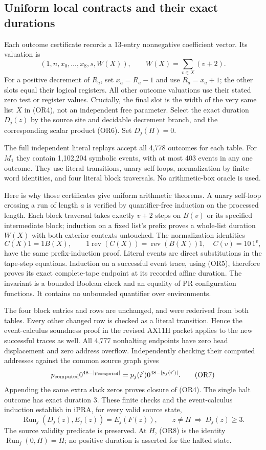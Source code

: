 \subsection{Uniform local contracts and their exact durations}

Each outcome certificate records a 13-entry nonnegative coefficient
vector.  Its valuation is
\[
 (1,n,x_0,\ldots,x_8,s,W(X)),\qquad
 W(X)=\sum_{v\in X}(v+2).
 \tag{OR6}
\]
For a positive decrement of $R_a$, set $x_a=R_a-1$ and use
$R_a=x_a+1$; the other slots equal their logical registers.
All other outcome valuations use their stated zero test or register
values.  Crucially, the final slot is the width of the very same
list $X$ in (OR4), not an independent free parameter.
Select the exact duration $D_j(z)$ by the source site and decidable
decrement branch, and the corresponding scalar product (OR6).
Set $D_j(H)=0$.

The full independent literal replays accept all 4,778 outcomes for
each table.  For $M_1$ they contain 1,102,204 symbolic events, with
at most 403 events in any one outcome.  They use literal transitions,
unary self-loops, normalization by finite-word identities, and four
literal block traversals.  No arithmetic-box oracle is used.

Here is why those certificates give uniform arithmetic theorems.
A unary self-loop crossing a run of length $a$ is verified by
quantifier-free induction on the processed length.  Each block
traversal takes exactly $v+2$ steps on $B(v)$ or its specified
intermediate block; induction on a fixed list's prefix proves a
whole-list duration $W(X)$ with both exterior contexts untouched.
The normalization identities
\[
 C(X)1=1B(X),\qquad
 1\operatorname{rev}(C(X))=\operatorname{rev}(B(X))1,
 \quad C(v)=10\,1^v,
\]
have the same prefix-induction proof.  Literal events are direct
substitutions in the tape-step equations.  Induction on a successful
event trace, using (OR5), therefore proves its exact complete-tape
endpoint at its recorded affine duration.  The invariant is a
bounded Boolean check and an equality of PR configuration functions.
It contains no unbounded quantifier over environments.

The four block entries and rows are unchanged, and were rederived
from both tables.  Every other changed row is checked as a literal
transition.  Hence the event-calculus soundness proof in the revised
AX11H packet applies to the new successful traces as well.
All 4,777 nonhalting endpoints have zero head displacement and
zero address overflow.  Independently checking their computed
addresses against the common source graph gives
\[
 p_{\rm computed}0^{48-|p_{\rm computed}|}
   =p_j(i')0^{48-|p_j(i')|}.
 \tag{OR7}
\]
Appending the same extra slack zeros proves closure of (OR4).
The single halt outcome has exact duration 3.  These finite checks
and the event-calculus induction establish in iPRA, for every valid
source state,
\[
 \operatorname{Run}_j(D_j(z),E_j(z))=E_j(F(z)),\qquad
 z\ne H\ \Longrightarrow\ D_j(z)\ge3.
 \tag{OR8}
\]
The source validity predicate is preserved.  At $H$, (OR8) is the
identity $\operatorname{Run}_j(0,H)=H$; no positive duration is
asserted for the halted state.

